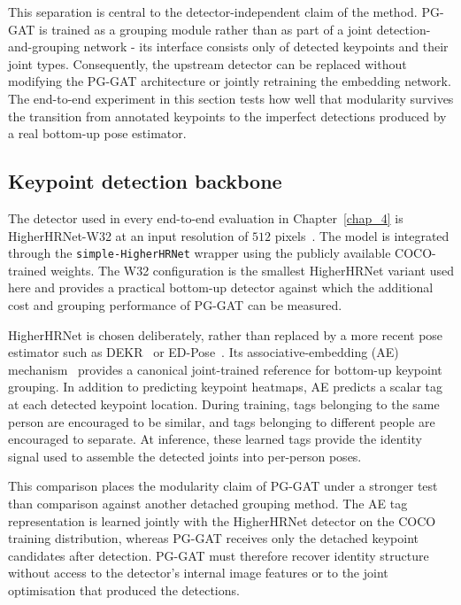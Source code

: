 This separation is central to the detector-independent claim
of the method.
PG-GAT is trained as a grouping module
rather than as part of a joint detection-and-grouping network -
its interface consists only of detected keypoints and their joint types.
Consequently,
the upstream detector can be replaced
without modifying the PG-GAT architecture
or jointly retraining the embedding network.
The end-to-end experiment in this section tests how well that modularity
survives the transition from annotated keypoints
to the imperfect detections produced by a real bottom-up pose estimator.

\subsection{Keypoint detection backbone}
\label{sec_meth_integration_detection}

The detector used in every end-to-end evaluation in
Chapter~\ref{chap_4} is HigherHRNet-W32 at an input resolution of
$512$ pixels~\cite{cheng2020higherhrnet,sun2019hrnet}.
The model is integrated through the \texttt{simple-HigherHRNet} wrapper
using the publicly available COCO-trained weights.
The W32 configuration is the smallest HigherHRNet variant used here
and provides a practical bottom-up detector against which
the additional cost and grouping performance of PG-GAT can be measured.

HigherHRNet is chosen deliberately,
rather than replaced by a more recent pose estimator
such as DEKR~\cite{geng2021dekr} or ED-Pose~\cite{yang2023edpose}.
Its associative-embedding (AE) mechanism~\cite{newell2017associative}
provides a canonical joint-trained reference for bottom-up keypoint grouping.
In addition to predicting keypoint heatmaps,
AE predicts a scalar tag at each detected keypoint location.
During training,
tags belonging to the same person are encouraged to be similar,
and tags belonging to different people are encouraged to separate.
At inference,
these learned tags provide the identity signal used to assemble
the detected joints into per-person poses.

This comparison places the modularity claim of PG-GAT under a stronger
test than comparison against another detached grouping method.
The AE tag representation is learned jointly with the HigherHRNet detector
on the COCO training distribution,
whereas PG-GAT receives only the detached keypoint candidates
after detection.
PG-GAT must therefore recover identity structure without access
to the detector's internal image features
or to the joint optimisation that produced the detections.

